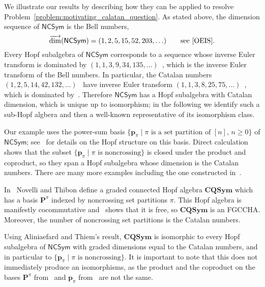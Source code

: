 \documentclass[11pt]{amsart}
\theoremstyle{definition}
\newtheorem{example}[theorem]{Example}
\numberwithin{equation}{section}
\newcommand{\FGCCHA}{\textsf{FGCCHA}\xspace}
\newcommand{\vecdim}{\overrightarrow{\dim}}
\newcommand{\NCSym}{\mathsf{NCSym}}
\begin{document}
\vspace{4ex}

We illustrate our results by describing how they can be applied to resolve Problem~\ref{problem:motivating_calatan_question}.  
As stated above, the dimension sequence of $\NCSym$ is the Bell numbers,
\[
\vecdim(\NCSym) = (1, 2, 5, 15, 52, 203, \ldots)
\qquad\text{see~\cite[\href{https://oeis.org/A000110}{A000110}]{OEIS}.}
\]
Every Hopf subalgebra of $\NCSym$ corresponds to a sequence whose inverse Euler transform is dominated by $(1, 1, 3, 9, 34, 135,\ldots)$~\cite[\href{https://oeis.org/A085686}{A085686}]{OEIS}, which is  the inverse Euler transform of the Bell numbers.  
In particular, the Catalan numbers $(1, 2, 5, 14, 42, 132, \ldots)$~\cite[\href{https://oeis.org/A000108}{A000108}]{OEIS} have inverse Euler transform $(1, 1, 3, 8, 25, 75,\ldots)$~\cite[\href{https://oeis.org/A022553}{A022553}]{OEIS}, which is dominated by~\cite[\href{https://oeis.org/A085686}{A085686}]{OEIS}.  
Therefore $\NCSym$ has a Hopf subalgebra with Catalan dimension, which is unique up to isomorphism; in the following we identify such a sub-Hopf algbera and then a well-known representative of its isomorphism class.  

Our example uses the power-sum basis $\{\mathbf{p}_{\pi} \;|\; \text{$\pi$ is a set partition of $[n]$, $n \ge 0$}\}$ of $\mathsf{NCSym}$; see~\cite{BHRZ05} for details on the Hopf structure on this basis.  
Direct calculation shows that the subset $\{\mathbf{p}_{\pi} \;|\; \text{$\pi$ is noncrossing}\}$ is closed under the product and coproduct, so they span a Hopf subalgebra whose dimension is the Catalan numbers.  
There are many more examples including the one constructed in~\cite{AT20}.

In~\cite{NT05} Novelli and Thibon define a graded connected Hopf algebra $\mathbf{CQSym}$ which has a basis $\mathbf{P}^{\pi}$ indexed by noncrossing set partitions $\pi$.  
This Hopf algebra is manifestly cocommutative and~\cite[Proposition 5.2]{NT05} shows that it is free, so $\mathbf{CQSym}$ is an \FGCCHA.  
Moreover, the number of noncrossing set partitions is the Catalan numbers.

Using Aliniaefard and Thiem's result, $\mathbf{CQSym}$ is isomorphic to every Hopf subalgebra of $\NCSym$ with graded dimensions equal to the Catalan numbers, and in particular to $\{\mathbf{p}_{\pi} \;|\; \text{$\pi$ is noncrossing}\}$.  
It is important to note that this does not immediately produce an isomorphisms, as the product and the coproduct on the bases $\mathbf{P}^{\pi}$ from~\cite{NT05} and $\mathbf{p}_{\pi}$ from~\cite{BHRZ05} are not the same.
\end{document}
